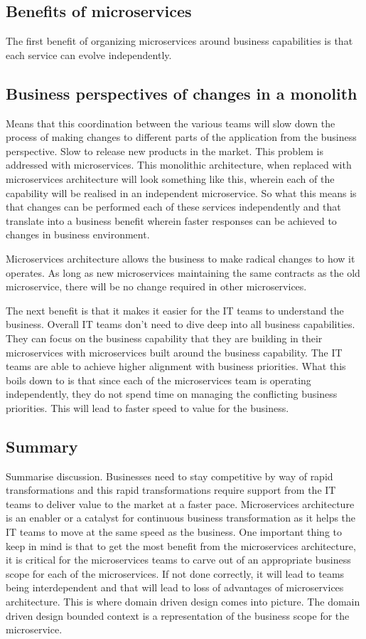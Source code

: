 \subsection{Benefits of microservices}
The first benefit of organizing microservices around business capabilities is that each service can evolve independently.

\subsection{Business perspectives of changes in a monolith}
Means that this coordination between the various teams will slow down the process of making changes to different parts of the application from the business perspective.
Slow to release new products in the market.
This problem is addressed with microservices.
This monolithic architecture, when replaced with microservices architecture will look something like this, wherein each of the capability will be realised in an independent microservice.
So what this means is that changes can be performed each of these services independently and that translate into a business benefit wherein faster responses can be achieved to changes in business environment.

Microservices architecture allows the business to make radical changes to how it operates.
As long as new microservices maintaining the same contracts as the old microservice, there will be no change required in other microservices.

The next benefit is that it makes it easier for the IT teams to understand the business.
Overall IT teams don't need to dive deep into all business capabilities.
They can focus on the business capability that they are building in their microservices with microservices built around the business capability.
The IT teams are able to achieve higher alignment with business priorities.
What this boils down to is that since each of the microservices team is operating independently, they do not spend time on managing the conflicting business priorities.
This will lead to faster speed to value for the business.

\subsection{Summary}
Summarise discussion.
Businesses need to stay competitive by way of rapid transformations and this rapid transformations require support from the IT teams to deliver value to the market at a faster pace.
Microservices architecture is an enabler or a catalyst for continuous business transformation as it helps the IT teams to move at the same speed as the business.
One important thing to keep in mind is that to get the most benefit from the microservices architecture,
it is critical for the microservices teams to carve out of an appropriate business scope for each of the microservices.
If not done correctly, it will lead to teams being interdependent and that will lead to loss of advantages of microservices architecture.
This is where domain driven design comes into picture.
The domain driven design bounded context is a representation of the business scope for the microservice.

